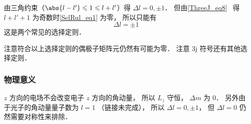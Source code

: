 由三角约束（$\abs{l-l'} \leqslant 1 \leqslant l + l'$）得 $\Delta l = 0, \pm 1$． 但由\autoref{ThreeJ_eq8}~ 得 $l + l' + 1$ 为奇数时\autoref{SelRul_eq1} 为零， 所以只能有
\begin{equation}
 \Delta l = \pm 1
\end{equation}
这是两个常见的选择定则．

注意符合以上选择定则的偶极子矩阵元仍然有可能为零． 注意 3j 符号还有其他选择定则．

\subsubsection{物理意义}
$z$ 方向的电场不会改变电子 $z$ 方向的角动量， 所以 $L_z$ 守恒， $\Delta m$ 为 0． 另外由于光子的角动量量子数为 $l=1$ （链接未完成）， 所以 $\Delta l = 0, \pm 1$， 但 $\Delta l = 0$ 仍然需要对称性来排除．
